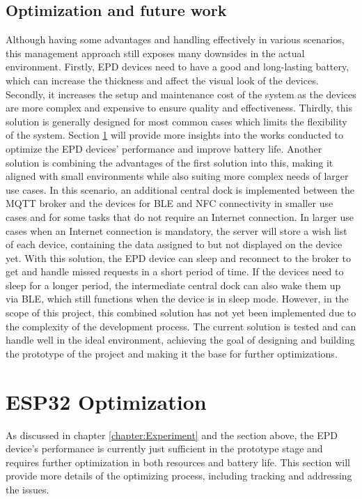 \documentclass[../Main.tex]{subfiles}
\begin{document}
\subsection{Optimization and future work}
Although having some advantages and handling effectively in various scenarios, this management approach still exposes many downsides in the actual environment. Firstly, EPD devices need to have a good and long-lasting battery, which can increase the thickness and affect the visual look of the devices. Secondly, it increases the setup and maintenance cost of the system as the devices are more complex and expensive to ensure quality and effectiveness. Thirdly, this solution is generally designed for most common cases which limits the flexibility of the system. Section \ref{section:optimization} will provide more insights into the works conducted to optimize the EPD devices' performance and improve battery life. Another solution is combining the advantages of the first solution into this, making it aligned with small environments while also suiting more complex needs of larger use cases. In this scenario, an additional central dock is implemented between the MQTT broker and the devices for BLE and NFC connectivity in smaller use cases and for some tasks that do not require an Internet connection. In larger use cases when an Internet connection is mandatory, the server will store a wish list of each device, containing the data assigned to but not displayed on the device yet. With this solution, the EPD device can sleep and reconnect to the broker to get and handle missed requests in a short period of time. If the devices need to sleep for a longer period, the intermediate central dock can also wake them up via BLE, which still functions when the device is in sleep mode. However, in the scope of this project, this combined solution has not yet been implemented due to the complexity of the development process. The current solution is tested and can handle well in the ideal environment, achieving the goal of designing and building the prototype of the project and making it the base for further optimizations.

\section{ESP32 Optimization}
\label{section:optimization}
As discussed in chapter \ref{chapter:Experiment} and the section above, the EPD device's performance is currently just sufficient in the prototype stage and requires further optimization in both resources and battery life. This section will provide more details of the optimizing process, including tracking and addressing the issues.
\end{document}
